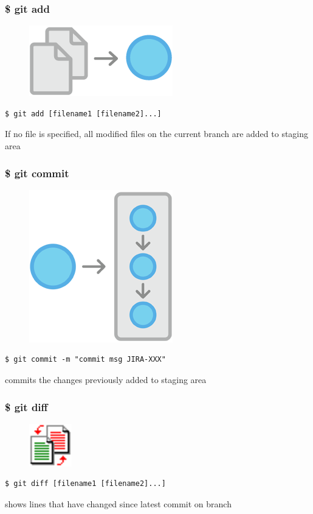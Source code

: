 \documentclass{beamer}
\begin{document}
\begin{frame}[fragile]
    \frametitle{\$ git add}
    \begin{figure}[h!]
        \begin{center}
            \includegraphics[scale=0.7]{add.png}
        \end{center}
    \end{figure}
    \begin{verbatim}
$ git add [filename1 [filename2]...]
    \end{verbatim}
    If no file is specified, all modified files on the current branch are added to staging area
\end{frame}

\begin{frame}[fragile]
    \frametitle{\$ git commit}
    \begin{figure}[h!]
        \begin{center}
            \includegraphics[scale=0.7]{commit.png}
        \end{center}
    \end{figure}
    \begin{verbatim}
$ git commit -m "commit msg JIRA-XXX"
    \end{verbatim}
    commits the changes previously added to staging area
\end{frame}

\begin{frame}[fragile]
    \frametitle{\$ git diff}
    \begin{figure}[h!]
        \begin{center}
            \includegraphics[scale=1.2]{diff.png}
        \end{center}
    \end{figure}
    \begin{verbatim}
$ git diff [filename1 [filename2]...]
    \end{verbatim}
    shows lines that have changed since latest commit on branch
\end{frame}
\end{document}
